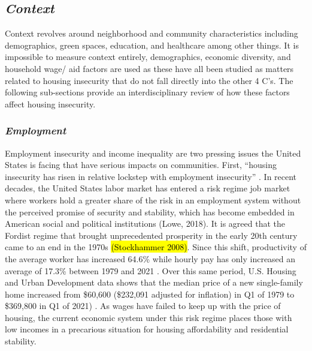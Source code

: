 \subsection{\textit{Context}}

Context revolves around neighborhood and community characteristics including demographics, green spaces, education, and healthcare among other things. It is impossible to measure context entirely, demographics, economic diversity, and household wage/ aid factors are used as these have all been studied as matters related to housing insecurity that do not fall directly into the other 4 C’s. The following sub-sections provide an interdisciplinary review of how these factors affect housing insecurity.  

\subsubsection{\textit{Employment}}
Employment insecurity and income inequality are two pressing issues the United States is facing that have serious impacts on communities. First, “housing insecurity has risen in relative lockstep with employment insecurity” \citep[48]{desmond_housing_2016-1}. In recent decades, the United States labor market has entered a risk regime job market where workers hold a greater share of the risk in an employment system without the perceived promise of security and stability, which has become embedded in American social and political institutions (Lowe, 2018). It is agreed that the Fordist regime that brought unprecedented prosperity in the early 20th century came to an end in the 1970s \hl{(Stockhammer 2008)}. Since this shift, productivity of the average worker has increased 64.6\% while hourly pay has only increased an average of 17.3\% between 1979 and 2021 \citep{noauthor_productivity-pay_2022}. Over this same period, U.S. Housing and Urban Development data shows that the median price of a new single-family home increased from \$60,600 (\$232,091 adjusted for inflation) in Q1 of 1979 to \$369,800 in Q1 of 2021) \citep{us_census_bureau_median_1963}. As wages have failed to keep up with the price of housing, the current economic system under this risk regime places those with low incomes in a precarious situation for housing affordability and residential stability.  

